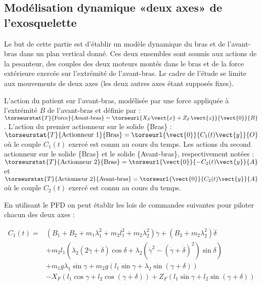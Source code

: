 \subsection*{Modélisation dynamique «deux axes» de l’exosquelette}

\begin{obj}
Le but de cette partie est d’établir un modèle dynamique du bras et de l’avant-bras dans un plan vertical
donné. Ces deux ensembles sont soumis aux actions de la pesanteur, des couples des deux moteurs montés
dans le bras et de la force extérieure exercée sur l’extrémité de l’avant-bras. Le cadre de l’étude se limite
aux mouvements de deux axes (les deux autres axes étant supposés fixes).
\end{obj}

L’action du patient sur l’avant-bras, modélisée par une force appliquée à l’extrémité $B$ de l’avant-bras et
définie par : 
$\torseurstat{T}{\text{Force}}{\text{Avant-bras}}=\torseurl{X_F\vect{x}+Z_F\vect{z}}{\vect{0}}{B}$. 
L’action du premier actionneur sur le solide \{Bras\} : $\torseurstat{T}{\text{Actionneur 1}}{\text{Bras}}=\torseurl{\vect{0}}{C_1(t) \vect{y}}{O}$ où le couple $C_1(t)$ exercé est connu au cours du temps.
Les actions du second actionneur sur le solide \{Bras\} et le solide \{Avant-bras\}, respectivement notées :
$\torseurstat{T}{\text{Actionneur 2}}{\text{Bras}}=\torseurl{\vect{0}}{-C_2(t) \vect{y}}{A}$ et 
$\torseurstat{T}{\text{Actionneur 2}}{\text{Avant-bras}}=\torseurl{\vect{0}}{C_2(t) \vect{y}}{A}$ où le couple $C_2(t)$ exercé est connu au cours du temps.

En utilisant le PFD on peut établir les lois de commandes suivantes pour piloter chacun des deux axes : 

$$
\begin{array}{ll}
C_1(t)=&
\left(B_1+B_2 +m_1 \lambda_1^2 + m_2 l_1^2 + m_2 \lambda_2^2 \right)\ddot{\gamma} +\left( B_2 + m_2\lambda_2^2\right) \ddot{\delta}\\
& +m_2 l_1 \left( \lambda_2 \left(2\ddot{\gamma}+\ddot{\delta} \right)\cos \delta + \lambda_2 \left( \dot{\gamma}^2-\left( \dot{\gamma} + \dot{\delta}\right)^2\right) \sin\delta\right) \\
& + m_1g\lambda_1\sin\gamma + m_2 g \left(l_1 \sin \gamma+\lambda_2 \sin \left(\gamma+ \delta\right) \right)\\
& -X_F \left( l_1 \cos \gamma +l_2 \cos \left( \gamma+\delta\right) \right) + Z_F \left( l_1 \sin \gamma + l_2 \sin \left( \gamma + \delta \right)\right)
\end{array}
$$


